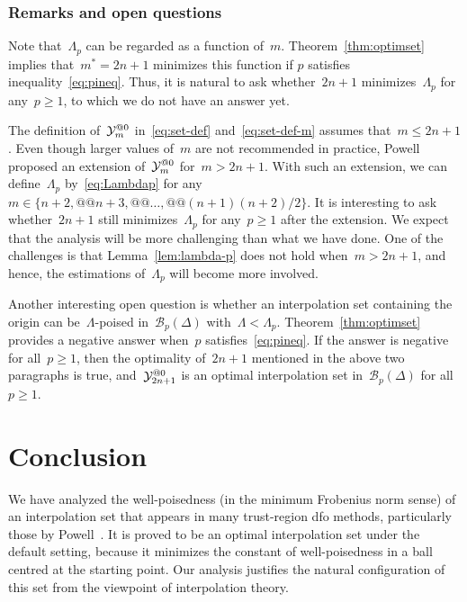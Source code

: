 \documentclass{article}
\makeatletter
\newcounter{cite}
\theoremstyle{definition}
\theoremstyle{plain}
\theoremstyle{remark}
\newcommand*{\set}[2][]{#1\{#2#1\}}
\newcommand*{\xpt}[1][]{\mathcal{Y}\ifblank{#1}{}{^{@#1}}}
\makeatother
\begin{document}
\subsubsection{Remarks and open questions}

Note that~$\Lambda_p$ can be regarded as a function of~$m$.
Theorem~\ref{thm:optimset} implies that~$m^\ast = 2n + 1$ minimizes this function if $p$ satisfies inequality~\eqref{eq:pineq}.
Thus, it is natural to ask whether~$2n+1$ minimizes~$\Lambda_p$ for any~$p \ge 1$, to which we do not have an answer yet.

The definition of~$\xpt[0]_m$ in~\eqref{eq:set-def} and~\eqref{eq:set-def-m} assumes that~$m \le 2n + 1$.
Even though larger values of~$m$ are not recommended in practice, Powell~\cite{Powell_2006} proposed an extension of~$\xpt[0]_m$ for~$m > 2n + 1$.
With such an extension, we can define~$\Lambda_p$ by~\eqref{eq:Lambdap} for any~$m \in \set{n + 2, @@ n +  3, @@ \dots, @@ (n + 1)(n + 2) / 2}$.
It is interesting to ask whether~$2n + 1$ still minimizes~$\Lambda_p$ for any~$p \ge 1$ after the extension.
We expect that the analysis will be more challenging than what we have done.
One of the challenges is that Lemma~\ref{lem:lambda-p} does not hold when~$m > 2n + 1$, and hence, the estimations of~$\Lambda_p$ will become more involved.

Another interesting open question is whether an interpolation set containing the origin can be~$\Lambda$-poised in~$\mathcal{B}_p(\Delta)$ with~$\Lambda < \Lambda_p$.
Theorem~\ref{thm:optimset} provides a negative answer when~$p$ satisfies~\eqref{eq:pineq}.
If the answer is negative for all~$p \ge 1$, then the optimality of~$2n + 1$ mentioned in the above two
paragraphs is true, and~$\xpt[0]_{2n + 1}$ is an optimal interpolation set in~$\mathcal{B}_p(\Delta)$ for all~$p \ge 1$.

\section{Conclusion}
\label{sec:conclusion}

We have analyzed the well-poisedness (in the minimum Frobenius norm sense) of an interpolation set that appears in many trust-region \gls{dfo} methods, particularly those by Powell~\cite{Powell_2006,Powell_2009}.
It is proved to be an optimal interpolation set under the default setting, because it minimizes the constant of well-poisedness in a ball centred at the starting point.
Our analysis justifies the natural configuration of this set from the viewpoint of interpolation theory.
\end{document}
